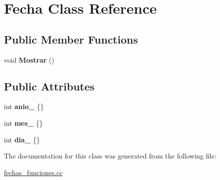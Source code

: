 \hypertarget{classFecha}{}\section{Fecha Class Reference}
\label{classFecha}
\subsection*{Public Member Functions}
\begin{DoxyCompactItemize}
\item 
\mbox{\label{classFecha_aacbfc256ce9d9a61644e33670aecc533}} 
void {\bfseries Mostrar} ()
\end{DoxyCompactItemize}
\subsection*{Public Attributes}
\begin{DoxyCompactItemize}
\item 
\mbox{\label{classFecha_ab40f984b1336be8d850a94cfe29ba8cb}} 
int {\bfseries anio\+\_\+} \{\}
\item 
\mbox{\label{classFecha_a43a03ccd3c3d0b5894f5d8d1f605e9f8}} 
int {\bfseries mes\+\_\+} \{\}
\item 
\mbox{\label{classFecha_a460e87ee488b5cf7f324e9ab0477a98c}} 
int {\bfseries dia\+\_\+} \{\}
\end{DoxyCompactItemize}


The documentation for this class was generated from the following file\+:\begin{DoxyCompactItemize}
\item 
\hyperlink{fechas__funciones_8cc}{fechas\+\_\+funciones.\+cc}\end{DoxyCompactItemize}
